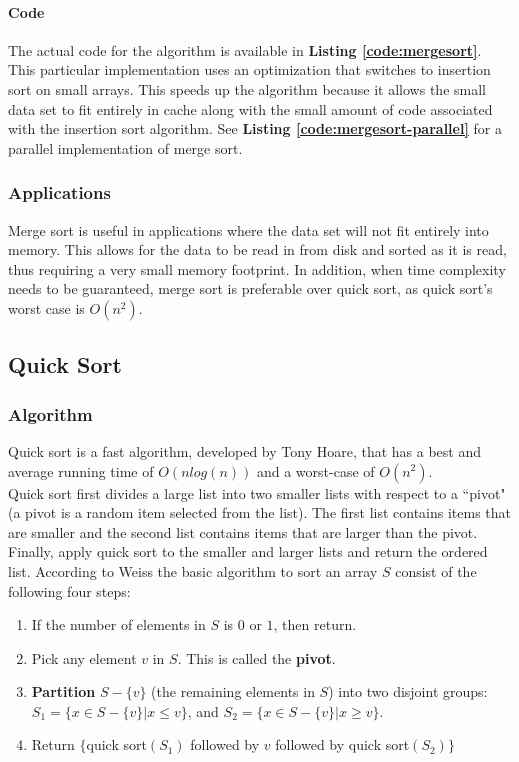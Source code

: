 \documentclass{article}
\begin{document}
        \paragraph{Code}
          The actual code for the algorithm is available in \textbf{Listing
          \ref{code:mergesort}}.  This particular implementation uses an
          optimization that switches to insertion sort on small arrays.  This
          speeds up the algorithm because it allows the small data set to fit
          entirely in cache along with the small amount of code associated with
          the insertion sort algorithm.  See \textbf{Listing
          \ref{code:mergesort-parallel}} for a parallel implementation of merge
          sort.
      \subsubsection{Applications}
        Merge sort is useful in applications where the data set will not fit
        entirely into memory.  This allows for the data to be read in from disk
        and sorted as it is read, thus requiring a very small memory footprint.
        In addition, when time complexity needs to be guaranteed, merge sort is
        preferable over quick sort, as quick sort's worst case is $O(n^2)$.
   \subsection{Quick Sort}
      \subsubsection{Algorithm}Quick sort is a fast algorithm, developed
by Tony Hoare, that has a 
best and average running time of $O(nlog(n))$ and a worst-case  of
$O(n^2)$.\\
Quick sort first divides a large list into two smaller lists with respect
to a ``pivot" (a pivot is a random item selected from the list). The 
first list contains items that are smaller and the second list contains 
items that are larger than the pivot. Finally, apply quick sort to the
smaller and larger lists and return the ordered list. 
According to Weiss\cite{weiss}  the basic algorithm to sort an array $S$ 
consist of the following four steps:
\begin{enumerate}
\item If the number of elements in $S$ is $0$ or $1$, then return.
\item Pick any element $v$ in $S$. This is called the \textbf{pivot}.
\item \textbf{Partition} $S - \{v\}$ (the remaining elements in $S$)
into two disjoint groups: $S_1 = \{x \in S - \{v\}|x\leq v\}$, and $S_2
= \{x \in S - \{v\}|x \geq v\}$.
\item Return $\{$quick sort$(S_1)$ followed by $v$ followed by
quick sort$(S_2)\}$
\end{enumerate}
\end{document}
